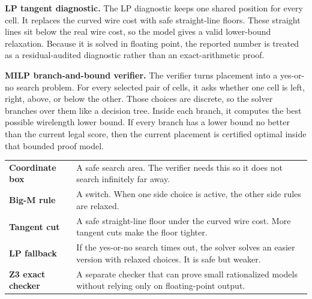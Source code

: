 \documentclass[11pt]{article}
\begin{document}
\begin{proofbox}
\textbf{LP tangent diagnostic.} The LP diagnostic keeps one shared position for every cell. It replaces the curved wire cost with safe straight-line floors. These straight lines sit below the real wire cost, so the model gives a valid lower-bound relaxation. Because it is solved in floating point, the reported number is treated as a residual-audited diagnostic rather than an exact-arithmetic proof.
\end{proofbox}

\begin{proofbox}
\textbf{MILP branch-and-bound verifier.} The verifier turns placement into a yes-or-no search problem. For every selected pair of cells, it asks whether one cell is left, right, above, or below the other. Those choices are discrete, so the solver branches over them like a decision tree. Inside each branch, it computes the best possible wirelength lower bound. If every branch has a lower bound no better than the current legal score, then the current placement is certified optimal inside that bounded proof model.
\end{proofbox}

\begin{tabularx}{\textwidth}{>{\bfseries\color{navy}}p{}X}
Coordinate box & A safe search area. The verifier needs this so it does not search infinitely far away. \\
Big-M rule & A switch. When one side choice is active, the other side rules are relaxed. \\
Tangent cut & A safe straight-line floor under the curved wire cost. More tangent cuts make the floor tighter. \\
LP fallback & If the yes-or-no search times out, the solver solves an easier version with relaxed choices. It is safe but weaker. \\
Z3 exact checker & A separate checker that can prove small rationalized models without relying only on floating-point output. \\
\end{tabularx}
\end{document}
